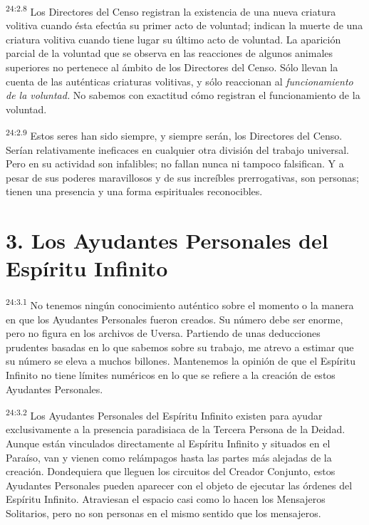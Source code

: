 \par
\textsuperscript{24:2.8} Los Directores del Censo registran la existencia de una nueva criatura volitiva cuando ésta efectúa su primer acto de voluntad; indican la muerte de una criatura volitiva cuando tiene lugar su último acto de voluntad. La aparición parcial de la voluntad que se observa en las reacciones de algunos animales superiores no pertenece al ámbito de los Directores del Censo. Sólo llevan la cuenta de las auténticas criaturas volitivas, y sólo reaccionan al \textit{funcionamiento de la voluntad.} No sabemos con exactitud cómo registran el funcionamiento de la voluntad.

\par
\textsuperscript{24:2.9} Estos seres han sido siempre, y siempre serán, los Directores del Censo. Serían relativamente ineficaces en cualquier otra división del trabajo universal. Pero en su actividad son infalibles; no fallan nunca ni tampoco falsifican. Y a pesar de sus poderes maravillosos y de sus increíbles prerrogativas, son personas; tienen una presencia y una forma espirituales reconocibles.

\section*{3. Los Ayudantes Personales del Espíritu Infinito}
\par
\textsuperscript{24:3.1} No tenemos ningún conocimiento auténtico sobre el momento o la manera en que los Ayudantes Personales fueron creados. Su número debe ser enorme, pero no figura en los archivos de Uversa. Partiendo de unas deducciones prudentes basadas en lo que sabemos sobre su trabajo, me atrevo a estimar que su número se eleva a muchos billones. Mantenemos la opinión de que el Espíritu Infinito no tiene límites numéricos en lo que se refiere a la creación de estos Ayudantes Personales.

\par
\textsuperscript{24:3.2} Los Ayudantes Personales del Espíritu Infinito existen para ayudar exclusivamente a la presencia paradisiaca de la Tercera Persona de la Deidad. Aunque están vinculados directamente al Espíritu Infinito y situados en el Paraíso, van y vienen como relámpagos hasta las partes más alejadas de la creación. Dondequiera que lleguen los circuitos del Creador Conjunto, estos Ayudantes Personales pueden aparecer con el objeto de ejecutar las órdenes del Espíritu Infinito. Atraviesan el espacio casi como lo hacen los Mensajeros Solitarios, pero no son personas en el mismo sentido que los mensajeros.

